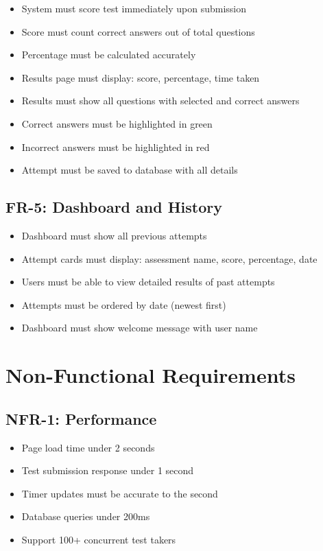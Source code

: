 \documentclass[12pt,a4paper]{report}
\begin{document}
\begin{itemize}
    \item System must score test immediately upon submission
    \item Score must count correct answers out of total questions
    \item Percentage must be calculated accurately
    \item Results page must display: score, percentage, time taken
    \item Results must show all questions with selected and correct answers
    \item Correct answers must be highlighted in green
    \item Incorrect answers must be highlighted in red
    \item Attempt must be saved to database with all details
\end{itemize}

\subsection{FR-5: Dashboard and History}

\begin{itemize}
    \item Dashboard must show all previous attempts
    \item Attempt cards must display: assessment name, score, percentage, date
    \item Users must be able to view detailed results of past attempts
    \item Attempts must be ordered by date (newest first)
    \item Dashboard must show welcome message with user name
\end{itemize}

\section{Non-Functional Requirements}

\subsection{NFR-1: Performance}

\begin{itemize}
    \item Page load time under 2 seconds
    \item Test submission response under 1 second
    \item Timer updates must be accurate to the second
    \item Database queries under 200ms
    \item Support 100+ concurrent test takers
\end{itemize}
\end{document}
